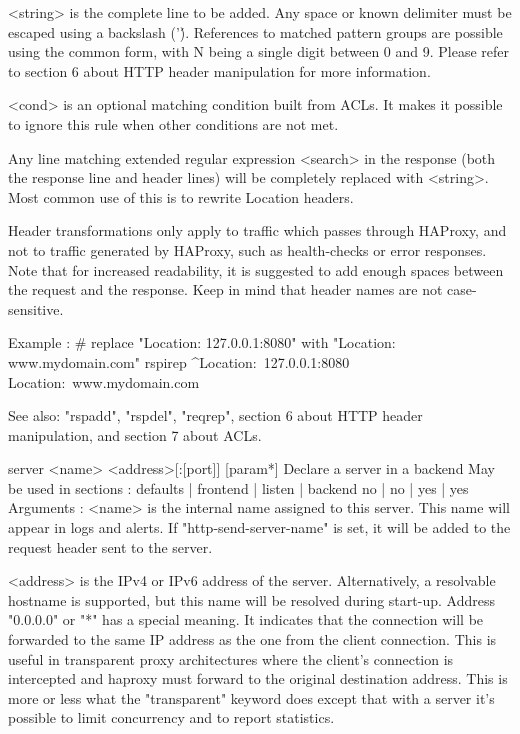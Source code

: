     <string>  is the complete line to be added. Any space or known delimiter
              must be escaped using a backslash ('\'). References to matched
              pattern groups are possible using the common \N form, with N
              being a single digit between 0 and 9. Please refer to section
              6 about HTTP header manipulation for more information.

    <cond>    is an optional matching condition built from ACLs. It makes it
              possible to ignore this rule when other conditions are not met.

  Any line matching extended regular expression <search> in the response (both
  the response line and header lines) will be completely replaced with
  <string>. Most common use of this is to rewrite Location headers.

  Header transformations only apply to traffic which passes through HAProxy,
  and not to traffic generated by HAProxy, such as health-checks or error
  responses. Note that for increased readability, it is suggested to add enough
  spaces between the request and the response. Keep in mind that header names
  are not case-sensitive.

  Example :
     # replace "Location: 127.0.0.1:8080" with "Location: www.mydomain.com"
     rspirep ^Location:\ 127.0.0.1:8080    Location:\ www.mydomain.com

  See also: "rspadd", "rspdel", "reqrep", section 6 about HTTP header
            manipulation, and section 7 about ACLs.


server <name> <address>[:[port]] [param*]
  Declare a server in a backend
  May be used in sections :   defaults | frontend | listen | backend
                                 no    |    no    |   yes  |   yes
  Arguments :
    <name>    is the internal name assigned to this server. This name will
              appear in logs and alerts.  If "http-send-server-name" is
              set, it will be added to the request header sent to the server.

    <address> is the IPv4 or IPv6 address of the server. Alternatively, a
              resolvable hostname is supported, but this name will be resolved
              during start-up. Address "0.0.0.0" or "*" has a special meaning.
              It indicates that the connection will be forwarded to the same IP
              address as the one from the client connection. This is useful in
              transparent proxy architectures where the client's connection is
              intercepted and haproxy must forward to the original destination
              address. This is more or less what the "transparent" keyword does
              except that with a server it's possible to limit concurrency and
              to report statistics.

